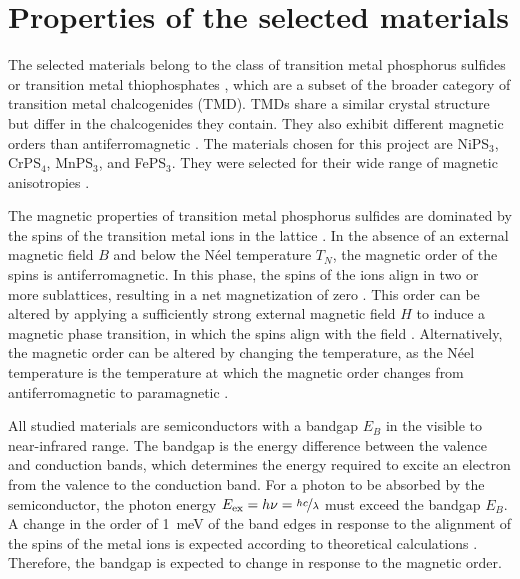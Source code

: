 \documentclass[
	twoside,
	parskip=half,
	a4paper,
]{scrbook}
\begin{document}
\section{Properties of the selected materials}
\todo[inline]{}
The selected materials belong to the class of transition metal phosphorus sulfides or transition metal thiophosphates \cite{MPS_magnetism}, which are a subset of the broader category of transition metal chalcogenides (TMD).
TMDs share a similar crystal structure but differ in the chalcogenides they contain. 
They also exhibit different magnetic orders than antiferromagnetic \cite{AFM_review}.
The materials chosen for this project are NiPS$_3$, CrPS$_4$, MnPS$_3$, and FePS$_3$.
They were selected for their wide range of magnetic anisotropies \cite{MPS_magnetism,CrPS4_magnetic}.

The magnetic properties of transition metal phosphorus sulfides are dominated by the spins of the transition metal ions in the lattice \cite{MPS_magnetism}.
In the absence of an external magnetic field $B$ and below the Néel temperature $T_N$, the magnetic order of the spins is antiferromagnetic.
In this phase, the spins of the ions align in two or more sublattices, resulting in a net magnetization of zero \cite[p.195]{afm}. 
This order can be altered by applying a sufficiently strong external magnetic field $H$ to induce a magnetic phase transition, in which the spins align with the field \cite{CrPS4_magnetic}.
Alternatively, the magnetic order can be altered by changing the temperature, as the Néel temperature is the temperature at which the magnetic order changes from antiferromagnetic to paramagnetic \cite{MPS_magnetism, CrPS4_magnetic}.

All studied materials are semiconductors with a bandgap $E_B$ in the visible to near-infrared range.
The bandgap is the energy difference between the valence and conduction bands, which determines the energy required to excite an electron from the valence to the conduction band.
For a photon to be absorbed by the semiconductor, the photon energy $E_\text{ex} = h\nu = \nicefrac{hc}{\lambda}$ must exceed the bandgap $E_B$.
A change in the order of \SI{1}{meV} of the band edges in response to the alignment of the spins of the metal ions is expected according to theoretical calculations \cite{MPX_first_principles}.
Therefore, the bandgap is expected to change in response to the magnetic order.
\end{document}
